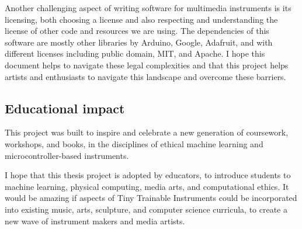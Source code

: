 Another challenging aspect of writing software for multimedia instruments is its licensing, both choosing a license and also respecting and understanding the license of other code and resources we are using. The dependencies of this software are mostly other libraries by Arduino, Google, Adafruit, and with different licenses including public domain, MIT, and Apache. I hope this document helps to navigate these legal complexities and that this project helps artists and enthusiasts to navigate this landscape and overcome these barriers.

\subsection{Educational impact}

This project was built to inspire and celebrate a new generation of coursework, workshops, and books, in the disciplines of ethical machine learning and microcontroller-based instruments.

I hope that this thesis project is adopted by educators, to introduce students to machine learning, physical computing, media arts, and computational ethics. It would be amazing if aspects of Tiny Trainable Instruments could be incorporated into existing music, arts, sculpture, and computer science curricula, to create a new wave of instrument makers and media artists.
